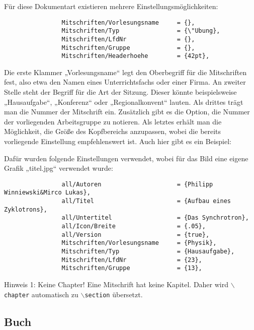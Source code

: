 				Für diese Dokumentart existieren mehrere Einstellungsmöglichkeiten: 
				
				\begin{verbatim}
				Mitschriften/Vorlesungsname     = {},
				Mitschriften/Typ                = {\"Ubung},
				Mitschriften/LfdNr              = {},
				Mitschriften/Gruppe             = {},
				Mitschriften/Headerhoehe        = {42pt},
				\end{verbatim}
				
				Die erste Klammer „Vorlesungsname“ legt den Oberbegriff für die Mitschriften fest, also etwa den Namen eines Unterrichtsfachs oder einer Firma. An zweiter Stelle steht der Begriff für die Art der Sitzung. Dieser könnte beispielsweise „Hausaufgabe“, „Konferenz“ oder „Regionalkonvent“ lauten. Als drittes trägt man die Nummer der Mitschrift ein. Zusätzlich gibt es die Option, die Nummer der vorliegenden Arbeitsgruppe zu notieren. Als letztes erhält man die Möglichkeit, die Größe des Kopfbereichs anzupassen, wobei die bereits vorliegende Einstellung empfehlenswert ist. Auch hier gibt es ein Beispiel: 
				
				\begin{center}
				\end{center}
				
				Dafür wurden folgende Einstellungen verwendet, wobei für das Bild eine eigene Grafik „titel.jpg“ verwendet wurde: 
				
				\begin{verbatim}
				all/Autoren						= {Philipp Winniewski&Mirco Lukas},	
				all/Titel	 					= {Aufbau eines Zyklotrons},
				all/Untertitel 					= {Das Synchrotron},
				all/Icon/Breite					= {.05},
				all/Version 					= {true},
				Mitschriften/Vorlesungsname 	= {Physik},
				Mitschriften/Typ 				= {Hausaufgabe},
				Mitschriften/LfdNr 				= {23},
				Mitschriften/Gruppe 			= {13},
				\end{verbatim}
				
				\begin{yellowboxIdx}{Hinweis 1: Keine Chapter!}
					Eine Mitschrift hat keine Kapitel. Daher wird \texttt{$\backslash$chapter} automatisch zu \texttt{$\backslash$section} übersetzt. 
				\end{yellowboxIdx}
				
			\subsection{Buch}
			
